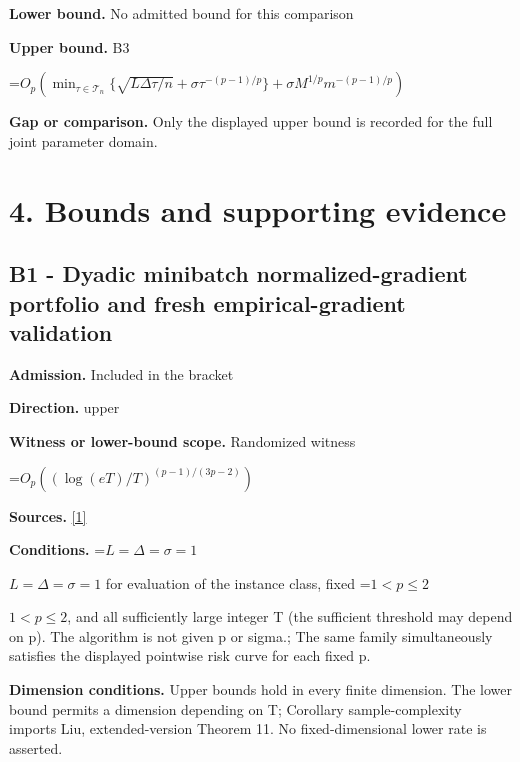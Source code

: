 \documentclass[10pt,a4paper]{article}
\newcommand{\AtlasMath}[1]{\par\begingroup\centering\setbox0=\hbox{$\displaystyle #1$}\ifdim\wd0>1.4\linewidth\typeout{ATLAS WIDE FORMULA: \the\wd0}\fi\ifdim\wd0>\linewidth\resizebox{\linewidth}{!}{\box0}\else\box0\fi\par\endgroup}
\newcommand{\AtlasInlineMath}[1]{\begingroup\setbox0=\hbox{$#1$}\ifdim\wd0>.4\linewidth\endgroup\AtlasMath{#1}\else\endgroup$#1$\fi}
\begin{document}
\textbf{Lower bound.} No admitted bound for this comparison



\textbf{Upper bound.} B3



\AtlasMath{O_p\!\left(\min_{\tau\in\mathcal T_n}\{\sqrt{L\Delta\tau/n}+\sigma\tau^{-(p-1)/p}\}+\sigma M^{1/p}m^{-(p-1)/p}\right)}


\textbf{Gap or comparison.} Only the displayed upper bound is recorded for the full joint parameter domain.



\section{4. Bounds and supporting evidence}


\subsection{B1 - Dyadic minibatch normalized-gradient portfolio and fresh empirical-gradient validation}


\textbf{Admission.} Included in the bracket



\textbf{Direction.} upper



\textbf{Witness or lower-bound scope.} Randomized witness



\AtlasMath{O_p\!\left((\log(eT)/T)^{(p-1)/(3p-2)}\right)}


\textbf{Sources.} \href{https://github.com/WU-Wendao/Colombo/blob/main/colombo_sensorium/Complexity_altas/data/sources/colombo/N05/manuscript.pdf}{[1]}



\textbf{Conditions.} \AtlasInlineMath{L=\Delta=\sigma=1} for evaluation of the instance class, fixed \AtlasInlineMath{1<p\le2}, and all sufficiently large integer T (the sufficient threshold may depend on p). The algorithm is not given p or sigma.; The same family simultaneously satisfies the displayed pointwise risk curve for each fixed p.



\textbf{Dimension conditions.} Upper bounds hold in every finite dimension. The lower bound permits a dimension depending on T; Corollary sample-complexity imports Liu, extended-version Theorem 11. No fixed-dimensional lower rate is asserted.
\end{document}
